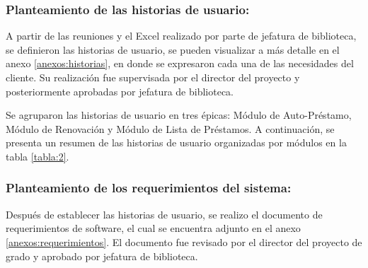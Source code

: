 \documentclass[spanish]{ieee_upb}
\begin{document}
\subsubsection{ Planteamiento de las historias de usuario:}
 A partir de las reuniones y el Excel realizado por parte de jefatura de biblioteca, se  definieron las historias de usuario, se pueden visualizar a más detalle en el anexo \ref{anexos:historias}, en donde se expresaron cada una de las necesidades del cliente.  Su realización fue supervisada por el director del proyecto y posteriormente aprobadas por jefatura de biblioteca. 
 \vspace{0.3 cm}

Se agruparon las historias de usuario en tres épicas: Módulo de Auto-Préstamo, Módulo de Renovación y Módulo de Lista de Préstamos. A continuación, se presenta un resumen de las historias de usuario organizadas por módulos en la tabla \ref{tabla:2}.


 \begin{table}[H]
\centering
\caption[Nombre en la lista de tablas]{\textbf{Resumen de las Historias de Usuario}}
    \label{tabla:2}
 \end{table}

\subsubsection{ Planteamiento de los requerimientos del sistema:}
 Después de establecer las historias de usuario, se realizo el documento de requerimientos de software, el cual se encuentra adjunto en el anexo \ref{anexos:requerimientos}. El documento fue revisado por el director del proyecto de grado y aprobado por jefatura de biblioteca.
\end{document}
